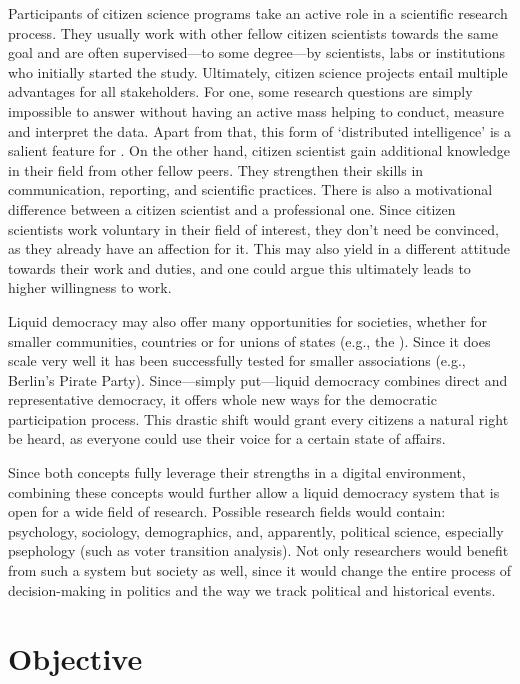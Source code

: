Participants of citizen science programs take an active role in a scientific research process. They usually work with other fellow citizen scientists towards the same goal and are often supervised---to some degree---by scientists, labs or institutions who initially started the study. Ultimately, citizen science projects entail multiple advantages for all stakeholders. For one, some research questions are simply impossible to answer without having an active mass helping to conduct, measure and interpret the data. Apart from that, this form of ‘distributed intelligence’ is a salient feature for . On the other hand, citizen scientist gain additional knowledge in their field from other fellow peers. They strengthen their skills in communication, reporting, and scientific practices. There is also a motivational difference between a citizen scientist and a professional one. Since citizen scientists work voluntary in their field of interest, they don’t need be convinced, as they already have an affection for it. This may also yield in a different attitude towards their work and duties, and one could argue this ultimately leads to higher willingness to work.

Liquid democracy may also offer many opportunities for societies, whether for smaller communities, countries or for unions of states (e.g., the ). Since it does scale very well it has been successfully tested for smaller associations (e.g., Berlin’s Pirate Party). Since---simply put---liquid democracy combines direct and representative democracy, it offers whole new ways for the democratic participation process. This drastic shift would grant every citizens a natural right be heard, as everyone could use their voice for a certain state of affairs.

Since both concepts fully leverage their strengths in a digital environment, combining these concepts would further allow a liquid democracy system that is open for a wide field of research. Possible research fields would contain: psychology, sociology, demographics, and, apparently, political science, especially psephology (such as voter transition analysis). Not only researchers would benefit from such a system but society as well, since it would change the entire process of decision-making in politics and the way we track political and historical events. 


\section{Objective}
\label{sec:Objective}

